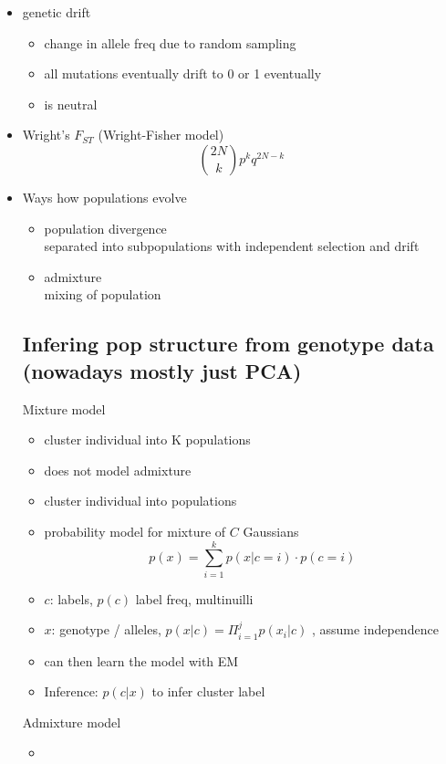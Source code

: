 \documentclass[font=12pt]{article}
\begin{document}
\begin{itemize}
\begin{itemize}
	\end{itemize}
	\item genetic drift
	\begin{itemize}
		\item change in allele freq due to random sampling
		\item all mutations eventually drift to 0 or 1 eventually
		\item is neutral
	\end{itemize}
	\item Wright's $ F_{ST} $ (Wright-Fisher model)\\
	\[ {{2N}\choose{k}} p^k q^{2N-k} \]
	\item Ways how populations evolve
	\begin{itemize}
		\item population divergence\\
		separated into subpopulations with independent selection and drift
		\item admixture\\
		mixing of population
	\end{itemize}
\subsection{Infering pop structure from genotype data (nowadays mostly just PCA)}
Mixture model 
\begin{itemize}
	\item cluster individual into K populations
	\item does not model admixture
	\item cluster individual into populations
	\item probability model for mixture of $ C $ Gaussians
	\[ p(x) = \sum_{i=1}^k p(x|c=i)\cdot p(c=i)\]
	\item $ c $: labels, $ p(c) $ label freq, multinuilli
	\item $ x $: genotype / alleles, $ p(x|c) = \Pi_{i=1}^j p(x_i|c)$ , assume independence
	\item can then learn the model with EM
	\item Inference: $p(c|x)$ to infer cluster label
\end{itemize}
Admixture model
\begin{itemize}
	\item 
\end{itemize}
\end{itemize}
\end{document}

